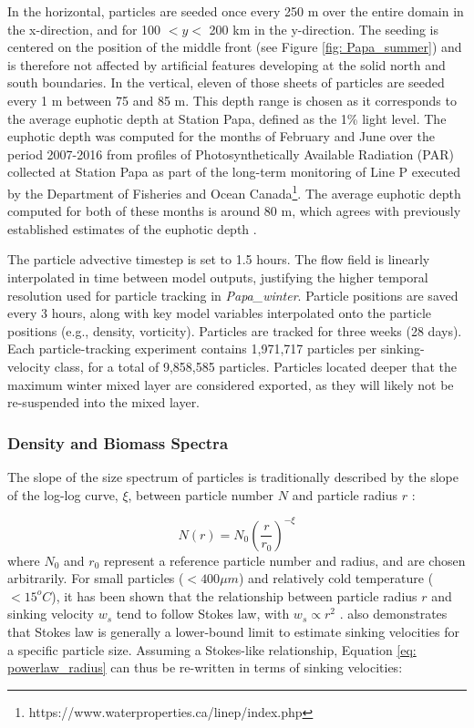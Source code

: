 \documentclass[draft,linenumbers]{agujournal2018}
\begin{document}
In the horizontal, particles are seeded once every 250 m over the entire domain in the x-direction, and for 100 $<y<$ 200 km in the y-direction. The seeding is centered on the position of the middle front (see Figure \ref{fig: Papa_summer}) and is therefore not affected by artificial features developing at the solid north and south boundaries. In the vertical, eleven of those sheets of particles are seeded every 1 m between 75 and 85 m. This depth range is chosen as it corresponds to the average euphotic depth at Station Papa, defined as the 1\% light level. The euphotic depth was computed for the months of February and June over the period 2007-2016 from profiles of Photosynthetically Available Radiation (PAR) collected at Station Papa as part of the long-term monitoring of Line P executed by the Department of Fisheries and Ocean Canada\footnote{https://www.waterproperties.ca/linep/index.php}. The average euphotic depth computed for both of these months is around 80 m, which agrees with previously established estimates of the euphotic depth \citep{Sherry_1999,Harrison_2004}.

The particle advective timestep is set to 1.5 hours. The flow field is linearly interpolated in time between model outputs, justifying the higher temporal resolution used for particle tracking in \textit{Papa\_winter}. Particle positions are saved every 3 hours, along with key model variables interpolated onto the particle positions (e.g., density, vorticity). Particles are tracked for three weeks (28 days). Each particle-tracking experiment contains 1,971,717 particles per sinking-velocity class, for a total of 9,858,585 particles. Particles located deeper that the maximum winter mixed layer \citep[i.e., 100 m;]{Pelland_2016, Plant_2016} are considered exported, as they will likely not be re-suspended into the mixed layer. %

\subsubsection{Density and Biomass Spectra}
\label{sec: equations_biomass}
The slope of the size spectrum of particles is traditionally described by the slope of the log-log curve, $\xi$, between particle number $N$ and particle radius $r$ \citep[also know as the Junge slope;][]{White_2015}:

\begin{equation}
N(r) = N_0 \left(\frac{r}{r_0}\right)^{-\xi}
\label{eq: powerlaw_radius}
\end{equation}
where $N_0$ and $r_0$ represent a reference particle number and radius, and are chosen arbitrarily. For small particles ($<400\mu m$) and relatively cold temperature ($<15^oC$), it has been shown that the relationship between particle radius $r$ and sinking velocity $w_s$ tend to follow Stokes law, with $w_s \propto r^2$ \citep{Bach_2012}. \cite{Bach_2012} also demonstrates that Stokes law is generally a lower-bound limit to estimate sinking velocities for a specific particle size. Assuming a Stokes-like relationship, Equation \ref{eq: powerlaw_radius} can thus be re-written in terms of sinking velocities:
\end{document}
